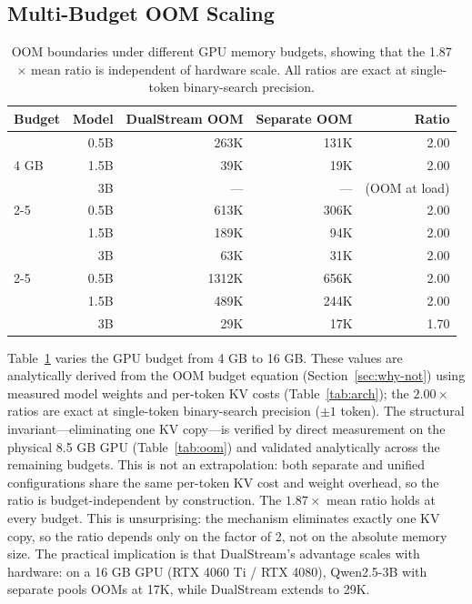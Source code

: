\documentclass[review]{elsarticle}
\theoremstyle{definition}
\theoremstyle{remark}
\begin{document}
\subsection{Multi-Budget OOM Scaling}

\begin{table}[t]
\centering
\caption{OOM boundaries under different GPU memory budgets, showing that
the 1.87$\times$ mean ratio is independent of hardware scale. All ratios
are exact at single-token binary-search precision.}
\label{tab:multibudget}
\begin{tabular}{lrrrr}
\toprule
Budget & Model & DualStream OOM & Separate OOM & Ratio \\
\midrule
\multirow{3}{*}{4 GB}
  & 0.5B & 263K & 131K & 2.00 \\
  & 1.5B & 39K  & 19K  & 2.00 \\
  & 3B   &---   &---   & (OOM at load) \\
\cline{2-5}
\multirow{3}{*}{8 GB}
  & 0.5B & 613K & 306K & 2.00 \\
  & 1.5B & 189K & 94K  & 2.00 \\
  & 3B   & 63K  & 31K  & 2.00 \\
\cline{2-5}
\multirow{3}{*}{16 GB}
  & 0.5B & 1312K & 656K & 2.00 \\
  & 1.5B & 489K  & 244K & 2.00 \\
  & 3B   & 29K  & 17K & 1.70 \\
\bottomrule
\end{tabular}
\end{table}

Table~\ref{tab:multibudget} varies the GPU budget from 4 GB to 16 GB.
These values are analytically derived from the OOM budget equation (Section~\ref{sec:why-not}) using measured model weights
and per-token KV costs (Table~\ref{tab:arch}); the $2.00\times$ ratios are
exact at single-token binary-search precision ($\pm{}1$ token). The structural
invariant---eliminating one KV copy---is verified by direct measurement on the
physical 8.5 GB GPU (Table~\ref{tab:oom}) and validated analytically across
the remaining budgets. This is not an extrapolation: both separate and unified
configurations share the same per-token KV cost and weight overhead, so the
ratio is budget-independent by construction.
The $1.87\times$ mean ratio holds at every budget. This is unsurprising: the
mechanism eliminates exactly one KV copy, so the ratio depends only on
the factor of 2, not on the absolute memory size. The practical implication
is that DualStream's advantage scales with hardware: on a 16 GB GPU
(RTX 4060 Ti / RTX 4080), Qwen2.5-3B with separate pools OOMs at 17K,
while DualStream extends to 29K.
\end{document}
